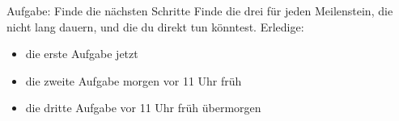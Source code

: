 \begin{frame}[c]
    \begin{block}{Aufgabe: Finde die nächsten Schritte}
        Finde die drei  für jeden Meilenstein, die nicht lang
        dauern, und die du direkt tun könntest. Erledige:
        \begin{itemize}
            \item die erste Aufgabe jetzt
            \item die zweite Aufgabe morgen vor 11 Uhr früh
            \item die dritte Aufgabe vor 11 Uhr früh übermorgen
        \end{itemize}
    \end{block}
\end{frame}


%
%
%
%
%
%

\fpause
